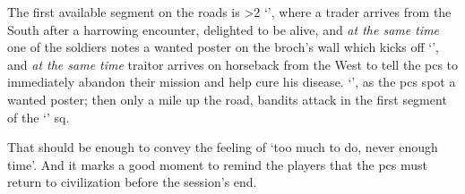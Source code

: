 \begin{multicols}{2}
The first available \gls{segment} on the roads is
\ifnum\value{cycle}>2%
  `', where a trader arrives from the South after a harrowing encounter, delighted to be alive, and \emph{at the same time} one of the \glspl{soldier} notes a wanted poster on the \gls{broch}'s wall which kicks off `', and \emph{at the same time} \gls{traitor} arrives on horseback from the West to tell the \glspl{pc} to immediately abandon their mission and help cure his disease.
\else
  `', as the \glspl{pc} spot a wanted poster; then only a mile up the road, bandits attack in the first \gls{segment} of the `' \gls{sq}.
\fi

That should be enough to convey the feeling of `too much to do, never enough time'.
And it marks a good moment to remind the players that the \glspl{pc} must return to civilization before the session's end.

\end{multicols}
